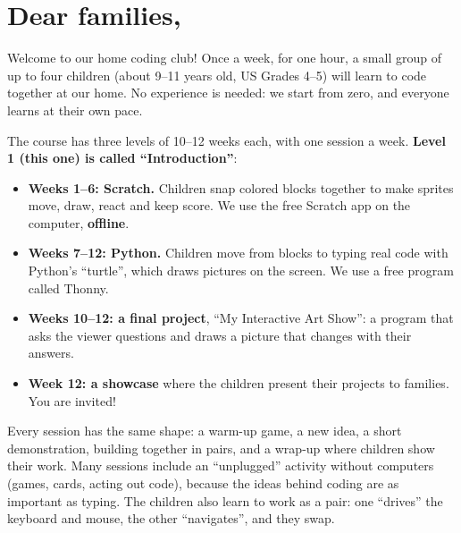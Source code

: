 \documentclass[level=1]{kidscode}
\begin{document}

\section{Dear families,}
Welcome to our home coding club! Once a week, for one hour, a small group of up to four children
(about 9--11 years old, US Grades 4--5) will learn to code together at our home. No experience is needed: we start
from zero, and everyone learns at their own pace.

The course has three levels of 10--12 weeks each, with one session a week. \textbf{Level 1 (this one) is called
\enquote{Introduction}}:
\begin{itemize}[itemsep=2pt]
  \item \textbf{Weeks 1--6: Scratch.} Children snap colored blocks together to make sprites move, draw,
        react and keep score. We use the free Scratch app on the computer, \textbf{offline}.
  \item \textbf{Weeks 7--12: Python.} Children move from blocks to typing real code with Python's
        \enquote{turtle}, which draws pictures on the screen. We use a free program called Thonny.
  \item \textbf{Weeks 10--12: a final project}, \enquote{My Interactive Art Show}: a program that asks
        the viewer questions and draws a picture that changes with their answers.
  \item \textbf{Week 12: a showcase} where the children present their projects to families. You are invited!
\end{itemize}
Every session has the same shape: a warm-up game, a new idea, a short demonstration, building
together in pairs, and a wrap-up where children show their work. Many sessions include an
\enquote{unplugged} activity without computers (games, cards, acting out code), because the ideas
behind coding are as important as typing. The children also learn to work as a pair: one
\enquote{drives} the keyboard and mouse, the other \enquote{navigates}, and they swap.
\end{document}
